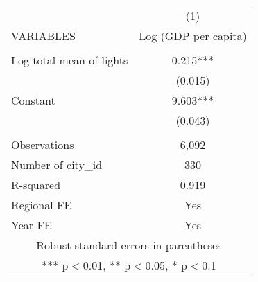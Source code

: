 \documentclass[]{article}
\begin{document}
\begin{tabular}{lc} \hline
 & (1) \\
VARIABLES & Log (GDP per capita) \\ \hline
 &  \\
Log total mean of lights & 0.215*** \\
 & (0.015) \\
Constant & 9.603*** \\
 & (0.043) \\
 &  \\
Observations & 6,092 \\
Number of city\_id & 330 \\
R-squared & 0.919 \\
Regional FE & Yes \\
 Year FE & Yes \\ \hline
\multicolumn{2}{c}{ Robust standard errors in parentheses} \\
\multicolumn{2}{c}{ *** p$<$0.01, ** p$<$0.05, * p$<$0.1} \\
\end{tabular}
\end{document}

